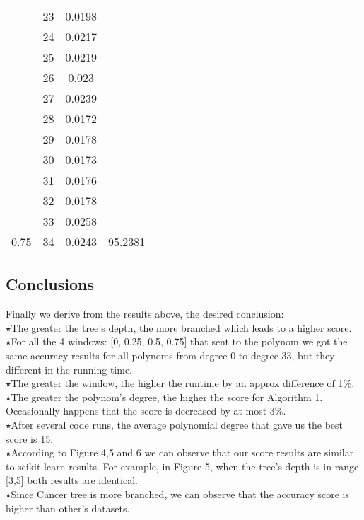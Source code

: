\documentclass{article}
\begin{document}
\begin{multicols}{2}
\begin{table}[H]
\begin{tabular}{|c|c|c|c|}
 & 23 & 0.0198 & \cellcolor[HTML]{FFFFC7} \\ \cline{2-3}
 & 24 & 0.0217 & \cellcolor[HTML]{FFFFC7} \\ \cline{2-3}
 & 25 & 0.0219 & \cellcolor[HTML]{FFFFC7} \\ \cline{2-3}
 & 26 & 0.023 & \cellcolor[HTML]{FFFFC7} \\ \cline{2-3}
 & 27 & 0.0239 & \cellcolor[HTML]{FFFFC7} \\ \cline{2-3}
 & 28 & 0.0172 & \cellcolor[HTML]{FFFFC7} \\ \cline{2-3}
 & 29 & 0.0178 & \cellcolor[HTML]{FFFFC7} \\ \cline{2-3}
 & 30 & 0.0173 & \cellcolor[HTML]{FFFFC7} \\ \cline{2-3}
 & 31 & 0.0176 & \cellcolor[HTML]{FFFFC7} \\ \cline{2-3}
 & 32 & 0.0178 & \cellcolor[HTML]{FFFFC7} \\ \cline{2-3}
 & 33 & 0.0258 & \cellcolor[HTML]{FFFFC7} \\ \cline{2-3}
\multirow{-35}{*}{0.75} & 34 & 0.0243 & \multirow{-24}{*}{\cellcolor[HTML]{FFFFC7}95.2381} \\ \hline
\end{tabular}
\end{table}

\end{multicols}


\newpage
\subsection{Conclusions}
Finally we derive from the results above, the desired conclusion:\\
$\smwhitestar$The greater the tree’s depth, the more branched which leads to a higher score.\\
$\smwhitestar$For all the 4 windows: [0, 0.25, 0.5, 0.75] that sent to the polynom we got the same accuracy results for all polynoms from degree 0 to degree 33, but they different in the running time.\\
$\smwhitestar$The greater the window, the higher the runtime by an approx difference of 1\%. \\
$\smwhitestar$The greater the polynom’s degree, the higher the score for Algorithm 1.
Occasionally happens that the score is decreased by at most 3\%.\\
$\smwhitestar$After several code runs, the average polynomial degree that gave us the best score is 15.\\
$\smwhitestar$According to Figure 4,5 and 6 we can observe that our score results are similar to scikit-learn results. For example, in Figure 5, when the tree's depth is in range [3,5] both results are identical.\\
$\smwhitestar$Since Cancer tree is more branched, we can observe that the accuracy score is higher than other's datasets.
\end{document}
